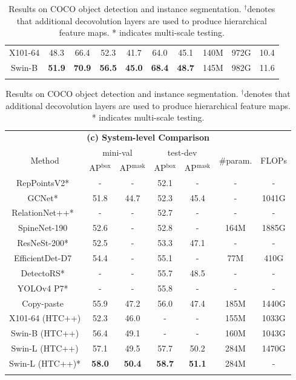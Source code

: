 \documentclass[10pt,twocolumn,letterpaper]{article}
\begin{document}
\begin{table}[t]
\begin{tabular}{c|ccc|ccc|ccc}
\hline
X101-64 & 48.3 & 66.4 & 52.3 & 41.7 & 64.0 & 45.1 & 140M & 972G & 10.4 \\
Swin-B & \textbf{51.9} & \textbf{70.9} & \textbf{56.5} & \textbf{45.0} & \textbf{68.4} & \textbf{48.7} & 145M & 982G & 11.6\\
\Xhline{1.0pt}
\end{tabular}
\addtolength{\tabcolsep}{0.9pt}
\begin{tabular}{c|cc|cc|cc}
\multicolumn{7}{c}{\textbf{(c) System-level Comparison}}  \\  
\multirow{2}{*}{Method} & \multicolumn{2}{c|}{mini-val} & \multicolumn{2}{c|}{test-dev} & \multirow{2}{*}{\#param.} & \multirow{2}{*}{FLOPs}  \\
 & AP$^\text{box}$ & AP$^\text{mask}$ & AP$^\text{box}$ & AP$^\text{mask}$ &  &  \\
\hline
RepPointsV2*~\cite{chen2020reppointsv2} & - & - & 52.1 & - & - & - \\
GCNet*~\cite{cao2019gcnet} & 51.8 & 44.7 & 52.3 & 45.4 & - & 1041G\\
RelationNet++*~\cite{chi2020relationnet++} & - & - & 52.7 & - & - & - \\
SpineNet-190~\cite{du2020spinenet} & 52.6 & - & 52.8 & - & 164M & 1885G \\
ResNeSt-200*~\cite{zhang2020resnest} & 52.5 & - & 53.3 & 47.1 & - & - \\
EfficientDet-D7~\cite{tan2020efficientdet} & 54.4 & - & 55.1 & - & 77M & 410G \\
DetectoRS*~\cite{qiao2020detectors} & - & - & 55.7 & 48.5 & - & - \\
YOLOv4 P7*~\cite{bochkovskiy2020yolov4} & - & - & 55.8 & - & - & - \\
Copy-paste~\cite{ghiasi2020copy} & 55.9 & 47.2 & 56.0 & 47.4 & 185M & 1440G \\
\hline
X101-64 (HTC++) & 52.3 & 46.0 & - & - & 155M & 1033G \\
\hline
Swin-B (HTC++) & 56.4 & 49.1 & - & - & 160M & 1043G \\
Swin-L (HTC++) & 57.1 & 49.5 & 57.7 & 50.2 & 284M & 1470G \\
Swin-L (HTC++)* & \textbf{58.0} & \textbf{50.4} & \textbf{58.7} & \textbf{51.1} & 284M & - \\
\Xhline{1.0pt}
\end{tabular}
\caption{Results on COCO object detection and instance segmentation. $^\dag$denotes that additional decovolution layers are used to produce hierarchical feature maps. * indicates multi-scale testing.}
\label{exp:coco}
\end{table}
\end{document}
